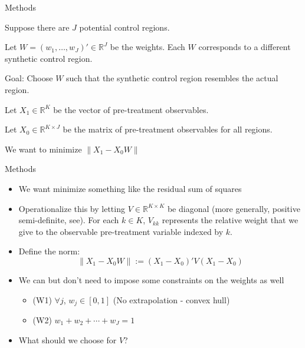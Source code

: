 \documentclass[notes,11pt, aspectratio=169]{beamer}
\newenvironment{wideitemize}{\itemize\addtolength{\itemsep}{10pt}}{\enditemize}
\begin{document}
\begin{frame}{Methods}
    \begin{wideitemize}
        \item Suppose there are $J$ potential control regions. \pause 
        \item Let $W = (w_1, \ldots, w_J)' \in \mathbb R^J$ be the weights. Each $W$ corresponds to 
        a different synthetic control region. \pause 
        \item Goal: Choose $W$ such that the synthetic control region resembles the actual region. \pause \medskip
        \begin{wideitemize}
            \item Let $X_1 \in \mathbb R^K$ be the vector of pre-treatment observables. 
            \item Let $X_0 \in \mathbb R^{K \times J}$ be the matrix of pre-treatment observables for all regions. 
            \item We want to minimize $\| X_1 - X_0 W\|$
        \end{wideitemize}
    \end{wideitemize}
\end{frame}

\begin{frame}{Methods}
    \begin{itemize}
        \item We want minimize something like the residual sum of squares \pause 
        \item Operationalize this by letting $V \in \mathbb R^{K \times K}$ be diagonal (more generally, positive semi-definite, see\cite{abadie_synthetic_2010}). For each $k \in K$, $V_{kk}$ represents the relative weight that we give to the observable pre-treatment variable indexed by $k$. \pause 
        \item Define the norm: 
        \[\|X_1 - X_0 W\| := (X_1 - X_0)' V (X_1 - X_0)\] \pause  
        \item We can but don't need to impose some constraints on the weights as well
        \begin{itemize}
            \item (W1) $\forall j$, $w_j \in [0,1]$ \quad \quad  (No extrapolation - convex hull)
            \item (W2) $w_1 + w_2 + \cdots + w_J = 1$
        \end{itemize}
        \item What should we choose for $V$? 
    \end{itemize}
\end{frame}
\end{document}
